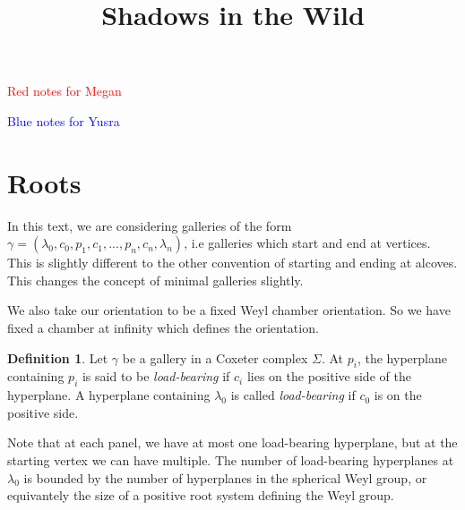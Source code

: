 \documentclass[11pt]{article}
\begin{document}
\newtheorem{theorem}{Theorem}
\theoremstyle{definition}
\newtheorem{definition}{Definition}
\newtheorem{proposition}{Proposition}
\newtheorem{example}{Example}
\newtheorem{lemma}{Lemma}
\newtheorem{corollary}{Corollary}
\newcommand{\uw}{\mathcal{U}(W,X)}
\newcommand{\W}{$(W,S)$}
\newcommand{\ix}{\textit}
\newcommand{\tr}{\textcolor{red}}
\newcommand{\sg}{$\Sigma$}


\title{Shadows in the Wild}
\maketitle
\tableofcontents 



\textcolor{red}{Red notes for Megan}

\textcolor{blue}{Blue notes for Yusra}

\section{Roots}

In this text, we are considering galleries of the form $\gamma=(\lambda_0,c_0,p_1,c_1,...,p_n,c_n,\lambda_n)$, i.e galleries which start and end at vertices. This is slightly different to the other convention of starting and ending at alcoves. This changes the concept of minimal galleries slightly. 

We also take our orientation to be a fixed Weyl chamber orientation. So we have fixed a chamber at infinity which defines the orientation.

\begin{definition}
    Let $\gamma$ be a gallery in a Coxeter complex $\Sigma$. At $p_i$, the hyperplane containing $p_i$ is said to be \ix{load-bearing} if $c_i$ lies on the positive side of the hyperplane. A hyperplane containing $\lambda_0$ is called \ix{load-bearing} if $c_0$ is on the positive side.
\end{definition}

Note that at each panel, we have at most one load-bearing hyperplane, but at the starting vertex we can have multiple. The number of load-bearing hyperplanes at $\lambda_0$ is bounded by the number of hyperplanes in the spherical Weyl group, or equivantely the size of a positive root system defining the Weyl group. 
\end{document}
